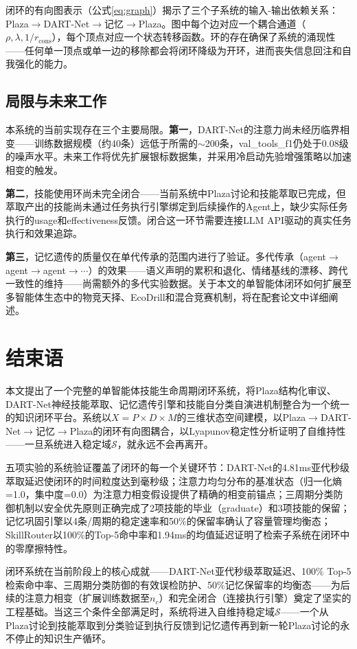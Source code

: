 \documentclass[12pt,a4paper]{ctexart}
\begin{document}
闭环的有向图表示（公式\ref{eq:graph}）揭示了三个子系统的输入-输出依赖关系：Plaza$\to$DART-Net$\to$记忆$\to$Plaza。图中每个边对应一个耦合通道（$\rho, \lambda, 1/r_{\text{cons}}$），每个顶点对应一个状态转移函数。环的存在确保了系统的涌现性——任何单一顶点或单一边的移除都会将闭环降级为开环，进而丧失信息回注和自我强化的能力。

\subsection{局限与未来工作}

本系统的当前实现存在三个主要局限。\textbf{第一}，DART-Net的注意力尚未经历临界相变——训练数据规模（约40条）远低于所需的$\sim$200条，val\_tools\_f1仍处于0.08级的噪声水平。未来工作将优先扩展银标数据集，并采用冷启动先验增强策略以加速相变的触发。

\textbf{第二}，技能使用环尚未完全闭合——当前系统中Plaza讨论和技能萃取已完成，但萃取产出的技能尚未通过任务执行引擎绑定到后续操作的Agent上，缺少实际任务执行的usage和effectiveness反馈。闭合这一环节需要连接LLM API驱动的真实任务执行和效果追踪。

\textbf{第三}，记忆遗传的质量仅在单代传承的范围内进行了验证。多代传承（agent$\to$agent$\to$agent$\to\cdots$）的效果——语义声明的累积和退化、情绪基线的漂移、跨代一致性的维持——尚需额外的多代实验数据。关于本文的单智能体闭环如何扩展至多智能体生态中的物竞天择、EcoDrill和混合竞赛机制，将在配套论文中详细阐述。

\section{结束语}

本文提出了一个完整的单智能体技能生命周期闭环系统，将Plaza结构化审议、DART-Net神经技能萃取、记忆遗传引擎和技能自分类自演进机制整合为一个统一的知识闭环平台。系统以$X = P \times D \times M$的三维状态空间建模，以Plaza$\to$DART-Net$\to$记忆$\to$Plaza的闭环有向图耦合，以Lyapunov稳定性分析证明了自维持性——一旦系统进入稳定域$\mathcal{S}$，就永远不会再离开。

五项实验的系统验证覆盖了闭环的每一个关键环节：DART-Net的4.81ms亚代秒级萃取延迟使闭环的时间粒度达到毫秒级；注意力均匀分布的基准状态（归一化熵=1.0，集中度=0.0）为注意力相变假设提供了精确的相变前锚点；三周期分类防御机制以安全优先原则正确完成了2项技能的毕业（graduate）和3项技能的保留；记忆巩固引擎以4条/周期的稳定速率和50\%的保留率确认了容量管理均衡态；SkillRouter以100\%的Top-5命中率和1.94ms的均值延迟证明了检索子系统在闭环中的零摩擦特性。

闭环系统在当前阶段上的核心成就——DART-Net亚代秒级萃取延迟、100\% Top-5检索命中率、三周期分类防御的有效误检防护、50\%记忆保留率的均衡态——为后续的注意力相变（扩展训练数据至$n_c$）和完全闭合（连接执行引擎）奠定了坚实的工程基础。当这三个条件全部满足时，系统将进入自维持稳定域$\mathcal{S}$——一个从Plaza讨论到技能萃取到分类验证到执行反馈到记忆遗传再到新一轮Plaza讨论的永不停止的知识生产循环。
\end{document}
